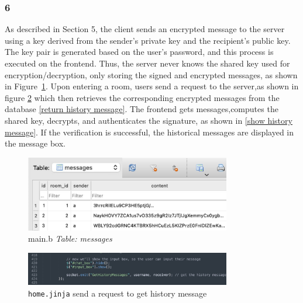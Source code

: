 \documentclass[12pt]{article}
\begin{document}
        \subsubsection*{6}
            As described in Section 5, the client sends an encrypted message to the server using a key derived from the sender's private key and the recipient's public key. The key pair is generated based on the user's password, and this process is executed on the frontend. Thus, the server never knows the shared key used for encryption/decryption, only storing the signed and encrypted messages, as shown in Figure~\ref{store history message}. Upon entering a room, users send a request to the server,as shown in figure \ref{get history message} which then retrieves the corresponding encrypted messages from the database \ref{return history message}. The frontend gets messages,computes the shared key, decrypts, and authenticates the signature, as shown in \ref{show history message}. If the verification is successful, the historical messages are displayed in the message box.

            \begin{figure}[H]
                \centering
                \includegraphics[width=0.8\textwidth]{graphs/store_history_message.jpg}
                \caption{main.b  \textit{Table: messages}}
                \label{store history message}
            \end{figure}

            \begin{figure}[H]
                \centering
                \includegraphics[width=0.8\textwidth]{graphs/join_room_get_history_message.jpg}
                \caption{\texttt{home.jinja} send a request to get history message}
                \label{get history message}
            \end{figure}
\end{document}
